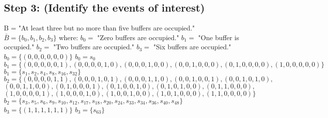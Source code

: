 \documentclass[a4paper,10pt]{article}
\begin{document}
\subsection{Step 3: (Identify the events of interest)}
B = "At least three but no more than five buffers are occupied." \newline
$ \bar{B} = \{b_{0}, b_{1}, b_{2}, b_{3}\} $ where: \newline
$ b_{0} = $ "Zero buffers are occupied." \newline
$ b_{1} = $ "One buffer is occupied." \newline
$ b_{2} = $ "Two buffers are occupied." \newline
$ b_{3} = $ "Six buffers are occupied." \newline
$ b_{0} = \{(0,0,0,0,0,0)\} $ \newline
$ b_{0} = s_{0} $ \newline
$ b_{1} = \{(0,0,0,0,0,1),(0,0,0,0,1,0),(0,0,0,1,0,0),(0,0,1,0,0,0),(0,1,0,0,0,0),(1,0,0,0,0,0)\} $ \newline
$ b_{1} = \{s_{1}, s_{2}, s_{4}, s_{8}, s_{16}, s_{32}\} $ \newline
$ b_{2} = \{(0,0,0,0,1,1),(0,0,0,1,0,1),(0,0,0,1,1,0),(0,0,1,0,0,1),(0,0,1,0,1,0), $ \newline
$ (0,0,1,1,0,0),(0,1,0,0,0,1),(0,1,0,0,1,0),(0,1,0,1,0,0),(0,1,1,0,0,0), $ \newline
$ (1,0,0,0,0,1),(1,0,0,0,1,0),(1,0,0,1,0,0),(1,0,1,0,0,0),(1,1,0,0,0,0)\} $ \newline
$ b_{2} = \{s_{3}, s_{5}, s_{6}, s_{9}, s_{10}, s_{12}, s_{17}, s_{18}, s_{20}, s_{24}, s_{33}, s_{34}, s_{36}, 
s_{40}, s_{48}\} $ \newline
$ b_{3} = \{(1,1,1,1,1,1)\} $ \newline
$ b_{3} = \{s_{63}\} $
\end{document}
